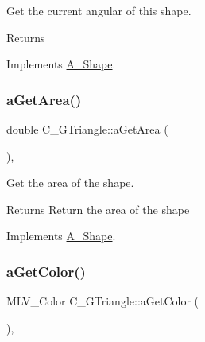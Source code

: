 Get the current angular of this shape. 

\begin{DoxyReturn}{Returns}

\end{DoxyReturn}


Implements \hyperlink{classA__Shape_a80fa4e009c875dd0ba7fc5bfeeb43f98}{A\+\_\+\+Shape}.

\mbox{\label{classC__GTriangle_a4d1c9a050aef86a7eab973b1fe668544}} 
\subsubsection{\texorpdfstring{a\+Get\+Area()}{aGetArea()}}
{\footnotesize\ttfamily double C\+\_\+\+G\+Triangle\+::a\+Get\+Area (\begin{DoxyParamCaption}{ }\end{DoxyParamCaption})\hspace{0.3cm}{\ttfamily [override]}, {\ttfamily [virtual]}}



Get the area of the shape. 

\begin{DoxyReturn}{Returns}
Return the area of the shape 
\end{DoxyReturn}


Implements \hyperlink{classA__Shape_a1b142ee2d873d6c217f65de1632e7b6e}{A\+\_\+\+Shape}.

\mbox{\label{classC__GTriangle_a19100d603f9239fd66f1115c4358f0fc}} 
\subsubsection{\texorpdfstring{a\+Get\+Color()}{aGetColor()}}
{\footnotesize\ttfamily M\+L\+V\+\_\+\+Color C\+\_\+\+G\+Triangle\+::a\+Get\+Color (\begin{DoxyParamCaption}{ }\end{DoxyParamCaption})\hspace{0.3cm}{\ttfamily [override]}, {\ttfamily [virtual]}}



